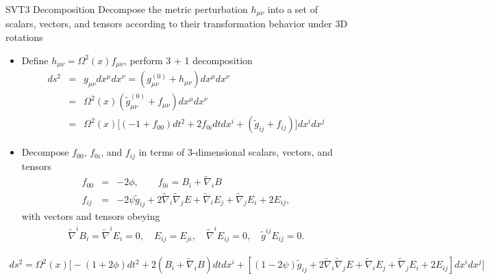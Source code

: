 \documentclass[8pt,aspectratio=1610]{beamer}
\begin{document}
\begin{frame}{SVT3 Decomposition}
	Decompose the metric perturbation $h_{\mu\nu}$ into a set of scalars, vectors, and tensors according to their transformation behavior under 3D rotations
	\begin{itemize}
		\item Define $h_{\mu\nu} = \Omega^2(x)f_{\mu\nu}$, perform 3 + 1 decomposition
		\begin{eqnarray}
			ds^2 &=& g_{\mu\nu}dx^\mu dx^\nu = (g_{\mu\nu}^{(0)} + h_{\mu\nu})dx^\mu dx^\nu
			\nonumber\\
			&=& \Omega^2(x)(\tilde g_{\mu\nu}^{(0)} + f_{\mu\nu})dx^\mu dx^\nu
			\nonumber\\
			&=& \Omega^2(x)\big[(-1+f_{00})dt^2 + 2f_{0i}dtdx^i + (\tilde g_{ij} + f_{ij})\big]dx^i dx^j
		\end{eqnarray}
		\item Decompose $f_{00}$, $f_{0i}$, and $f_{ij}$ in terms of 3-dimensional scalars, vectors, and tensors
		\begin{eqnarray}
			f_{00} &=& -2\phi,\qquad f_{0i} = B_i + \tilde\nabla_i B
			\nonumber\\
			f_{ij} &=& -2\psi \tilde g_{ij} + 2\tilde\nabla_i \tilde\nabla_j E + \tilde\nabla_i E_j + \tilde\nabla_j E_i + 2E_{ij},
		\end{eqnarray}
		with vectors and tensors obeying
		\begin{eqnarray}
			\tilde\nabla^i B_i = \tilde\nabla^i E_i = 0,\quad E_{ij} = E_{ji},\quad\tilde\nabla^i E_{ij} = 0,\quad \tilde g^{ij}E_{ij} = 0.
		\end{eqnarray}
	\end{itemize}
	\begin{eqnarray}
		ds^2 = \Omega^2(x)\bigg[-(1+2\phi)dt^2 + 2(B_i + \tilde\nabla_i B)dt dx^i 
		+ [(1-2\psi)\tilde g_{ij} + 2\tilde\nabla_i \tilde\nabla_j E + \tilde\nabla_i E_j + \tilde\nabla_j E_i + 2E_{ij}]dx^i dx^j\bigg]
	\end{eqnarray}
\end{frame}

\end{document}
